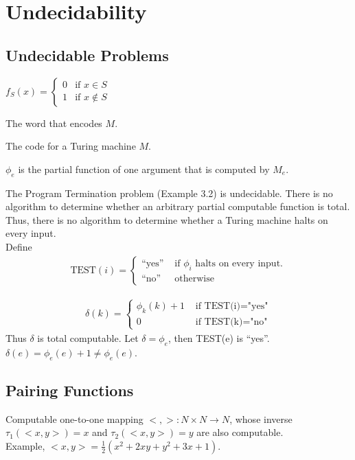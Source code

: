\section{Undecidability}

\subsection{Undecidable Problems}

$f_{S}(x) = \begin{cases}
  0 & \text{if } x \in S \\ 
  1 & \text{if } x \notin S
\end{cases}$

 The word that encodes $M$.

 The code for a Turing machine $M$.

 $\phi_e$ is the partial function of one
argument that is computed by $M_e$.

 The Program Termination problem (Example 3.2) is undecidable.
There is no algorithm to determine whether an arbitrary partial computable
function is total. Thus, there is no algorithm to determine whether a Turing
machine
halts on every input.\\
Define
\begin{align*}
  \text{TEST}(i) = 
  \begin{cases}
    \text{``yes''} & \text{ if } \phi_i \text{ halts on every input.} \\
    \text{``no''} & \text{ otherwise}
  \end{cases}
\end{align*}

\begin{align*}
  \delta(k) =
  \begin{cases}
    \phi_k(k)+1 & \text{ if TEST(i)="yes"} \\
    0 & \text{ if TEST(k)="no"}
  \end{cases}
\end{align*}
Thus $\delta$ is total computable. Let $\delta=\phi_e$, then TEST(e) is ``yes''.
$\delta(e)=\phi_e(e)+1 \neq \phi_e(e)$.

\subsection{Pairing Functions}
 Computable one-to-one mapping $<,>:N \times N \rightarrow
N$, whose inverse $\tau_1(<x,y>)=x$ and $\tau_2(<x,y>)=y$ are also computable.\\
Example, $<x,y>=\frac{1}{2}(x^2+2xy+y^2+3x+1)$.


